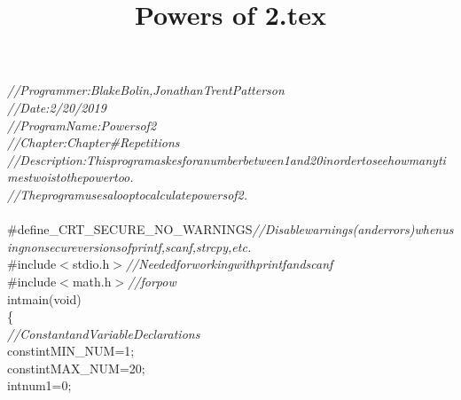 \documentclass[a4paper, 10pt]{article}
\title{Powers of 2.tex}
\newcommand\SPC{\hspace*{0.6em}}
\newcommand\TAB{\hspace*{1.2em}}
\newcommand\HYP{\mbox{\char 45}}
\newcommand{\CppAComment}[1]{\textit{\textcolor[rgb]{0.4,0.45,0.48}{#1}}}
\newcommand{\CppAIdentifier}[1]{\textcolor[rgb]{0.88,0.89,0.89}{#1}}
\newcommand{\CppANumber}[1]{\textcolor[rgb]{1,0.8,0.13}{#1}}
\newcommand{\CppAPreprocessor}[1]{\textcolor[rgb]{0.63,0.51,0.74}{#1}}
\newcommand{\CppAReservedWord}[1]{\textcolor[rgb]{0.4,0.55,0.69}{#1}}
\newcommand{\CppASpace}[1]{\colorbox[rgb]{0.16,0.19,0.2}{#1}}
\newcommand{\CppASymbol}[1]{\textcolor[rgb]{0.91,0.89,0.72}{#1}}
\begin{document}
\begin{ttfamily}
\noindent
\CppAComment{//\SPC Programmer:\TAB \TAB Blake\SPC Bolin,\SPC Jonathan\SPC Trent\SPC Patterson}\\
\CppAComment{//\SPC Date:\TAB \TAB \TAB 2/20/2019}\\
\CppAComment{//\SPC Program\SPC Name:\TAB Powers\SPC of\SPC 2}\\
\CppAComment{//\SPC Chapter:\TAB \TAB \TAB Chapter\SPC \#\SPC \HYP \SPC Repetitions}\\
\CppAComment{//\SPC Description:\TAB \TAB This\SPC program\SPC askes\SPC for\SPC a\SPC number\SPC between\SPC 1\SPC and\SPC 20\SPC in\SPC order\SPC to\SPC see\SPC how\SPC many\SPC times\SPC two\SPC is\SPC to\SPC the\SPC power\SPC too.}\\
\CppAComment{//\TAB \TAB \TAB \TAB \TAB The\SPC program\SPC uses\SPC a\SPC loop\SPC to\SPC calculate\SPC powers\SPC of\SPC 2.}\\
\\
\CppAPreprocessor{\#define\SPC \_CRT\_SECURE\_NO\_WARNINGS\SPC }\CppAComment{//\SPC Disable\SPC warnings\SPC (and\SPC errors)\SPC when\SPC using\SPC non\HYP secure\SPC versions\SPC of\SPC printf,\SPC scanf,\SPC strcpy,\SPC etc.}\\
\CppAPreprocessor{\#include\SPC $<$stdio.h$>$\SPC }\CppAComment{//\SPC Needed\SPC for\SPC working\SPC with\SPC printf\SPC and\SPC scanf}\\
\CppAPreprocessor{\#include\SPC $<$math.h$>$\SPC }\CppAComment{//\SPC for\SPC pow}\\
\CppAReservedWord{int}\CppASpace{\SPC }\CppAIdentifier{main}\CppASymbol{(}\CppAReservedWord{void}\CppASymbol{)}\\
\CppASymbol{\{}\\
\CppASpace{\TAB }\CppAComment{//\SPC Constant\SPC and\SPC Variable\SPC Declarations}\\
\CppASpace{\TAB }\CppAReservedWord{const}\CppASpace{\SPC }\CppAReservedWord{int}\CppASpace{\SPC }\CppAIdentifier{MIN\_NUM}\CppASpace{\SPC }\CppASymbol{=}\CppASpace{\SPC }\CppANumber{1}\CppASymbol{;}\\
\CppASpace{\TAB }\CppAReservedWord{const}\CppASpace{\SPC }\CppAReservedWord{int}\CppASpace{\SPC }\CppAIdentifier{MAX\_NUM}\CppASpace{\SPC }\CppASymbol{=}\CppASpace{\SPC }\CppANumber{20}\CppASymbol{;}\\
\CppASpace{\TAB }\CppAReservedWord{int}\CppASpace{\SPC }\CppAIdentifier{num1}\CppASpace{\SPC }\CppASymbol{=}\CppASpace{\SPC }\CppANumber{0}\CppASymbol{;}\\

\end{ttfamily}
\end{document}
